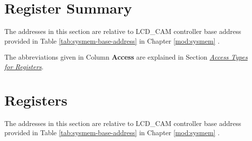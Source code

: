 \documentclass[main\_\_EN.tex]{subfiles}
\begin{document}



\clearpage
\hypertarget{camlcdctrl-reg-summ}{}
\section{Register Summary}
\label{sec:camlcdctrl-reg-summ}

The addresses in this section are relative to LCD\_CAM controller base address provided in Table \ref{tab:sysmem-base-address} in Chapter \ref{mod:sysmem} \textit{}.

The abbreviations given in Column \textbf{Access} are explained in Section \hyperref[glossary-access-types]{\textit{Access Types for Registers}}.






\clearpage
\section{Registers}

The addresses in this section are relative to LCD\_CAM controller base address provided in Table \ref{tab:sysmem-base-address} in Chapter \ref{mod:sysmem} \textit{}.


\end{document}
